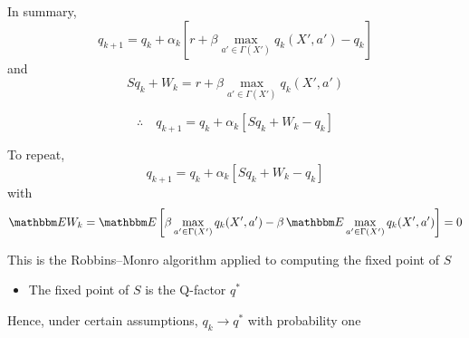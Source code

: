 \documentclass[xcolor=dvipsnames]{beamer}  %
\newcommand{\fore}{\therefore \quad}
\newcommand{\1}{\mathbbm 1}
\newcommand{\EE}{\mathbbm E}
\begin{document}
\begin{frame}

    In summary,
    \begin{equation*}
        q_{k+1} 
        = q_k + \alpha_k 
        \left[
            r + \beta \max_{a' \in \Gamma(X')} q_k(X', a')
            - q_k
        \right]
    \end{equation*}
    and
    \begin{equation*}
          S q_k + W_k
        = r + \beta \max_{a' \in \Gamma(X')} q_k(X', a')
    \end{equation*}

    \begin{equation*}
        \fore
        q_{k+1} 
        = q_k + \alpha_k 
        \left[
            S q_k + W_k - q_k
        \right]
    \end{equation*}

\end{frame}

\begin{frame}
    
    To repeat,
    \begin{equation*}
        q_{k+1} 
        = q_k + \alpha_k 
        \left[
            S q_k + W_k - q_k
        \right]
    \end{equation*}
    with
    \begin{equation*}
        \EE W_k 
        = \EE 
        \left[ 
            \beta \max_{a' \in \Gamma(X')} q_k(X', a') 
            - \beta \, \EE \max_{a' \in \Gamma(X')} q_k(X', a')
        \right] = 0
    \end{equation*}

    This is the Robbins--Monro algorithm applied to computing the fixed point
    of $S$

    \begin{itemize}
        \item The fixed point of $S$ is the Q-factor $q^*$
    \end{itemize}
            \vspace{0.5em}
            \vspace{0.5em}

    Hence, under certain assumptions, $q_k \to q^*$ with probability one

\end{frame}
\end{document}
